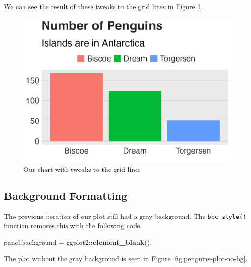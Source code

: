\documentclass[
]{book}
\newenvironment{Shaded}{\begin{snugshade}}{\end{snugshade}}
\newcommand{\FunctionTok}[1]{\textcolor[rgb]{0.13,0.29,0.53}{\textbf{#1}}}
\newcommand{\NormalTok}[1]{#1}
\newcommand{\OtherTok}[1]{\textcolor[rgb]{0.56,0.35,0.01}{#1}}
\newcommand{\SpecialCharTok}[1]{\textcolor[rgb]{0.81,0.36,0.00}{\textbf{#1}}}
\begin{document}
We can see the result of these tweaks to the grid lines in Figure \ref{fig:penguins-plot-gridlines-plot}.

\begin{figure}
\includegraphics[width=1\linewidth]{custom-theme_files/figure-latex/penguins-plot-gridlines-plot-1} \caption{Our chart with tweaks to the grid lines}\label{fig:penguins-plot-gridlines-plot}
\end{figure}

\hypertarget{background-formatting}{%
\subsection*{Background Formatting}\label{background-formatting}}

The previous iteration of our plot still had a gray background. The \texttt{bbc\_style()} function removes this with the following code.

\begin{Shaded}
\begin{Highlighting}[]
\NormalTok{panel.background }\OtherTok{=}\NormalTok{ ggplot2}\SpecialCharTok{::}\FunctionTok{element\_blank}\NormalTok{(),}
\end{Highlighting}
\end{Shaded}

The plot without the gray background is seen in Figure \ref{fig:penguins-plot-no-bg}.
\end{document}
